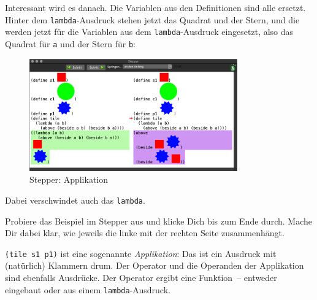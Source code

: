 %
\noindent Interessant wird es danach. Die Variablen aus den Definitionen sind
alle ersetzt.  Hinter dem \texttt{lambda}-Ausdruck stehen jetzt das
Quadrat und der Stern, und die werden jetzt für die Variablen aus dem
\texttt{lambda}-Ausdruck eingesetzt, also das Quadrat für \texttt{a}
und der Stern für \texttt{b}:
%
\begin{figure}[H]
  \centering
  \includegraphics[width=0.8\textwidth]{i1prog/stepper-3}
  \caption{Stepper: Applikation}
  \label{fig:stepper-3}
\end{figure}
%
\noindent Dabei verschwindet auch das \texttt{lambda}.
%
\begin{aufgabe}
  Probiere das Beispiel im Stepper aus und klicke Dich bis zum Ende
  durch. Mache Dir dabei klar, wie jeweils die linke mit der rechten
  Seite zusammenhängt.
\end{aufgabe}
%
\texttt{(tile s1 p1)} ist eine sogenannte
\textit{Applikation}: Das ist ein Ausdruck mit
(natürlich) Klammern drum.  Der Operator und die Operanden der
Applikation sind ebenfalls Ausdrücke.  Der Operator ergibt eine
Funktion~-- entweder eingebaut oder aus einem
\texttt{lambda}-Ausdruck.

